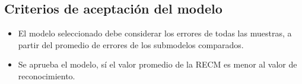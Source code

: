 \subsection{Criterios de aceptaci\'on del modelo}
\begin{itemize}
	\item El modelo seleccionado debe considerar los errores de todas las muestras, a partir del promedio de errores de los submodelos comparados.
	\item Se aprueba el modelo, s\'i el valor promedio de la RECM es menor al valor de  reconocimiento.
\end{itemize}